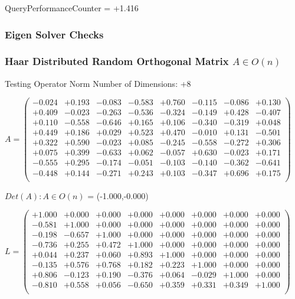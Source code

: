 \documentclass[9pt]{article}
\theoremstyle{plain}
\theoremstyle{definition}
\theoremstyle{remark}
\numberwithin{equation}{section}
\begin{document}
QueryPerformanceCounter  =  +1.416
\subsubsection{Eigen Solver Checks}
\subsubsection{Haar Distributed Random Orthogonal Matrix $A \in O(n)$}
 Testing Operator Norm
Number of Dimensions: +8

$A = \left(
\begin{array}{
cccccccc}
-0.024 & +0.193 & -0.083 & -0.583 & +0.760 & -0.115 & -0.086 & +0.130 \\
+0.409 & -0.023 & -0.263 & -0.536 & -0.324 & -0.149 & +0.428 & -0.407 \\
+0.110 & -0.558 & -0.646 & +0.165 & +0.106 & -0.340 & -0.319 & +0.048 \\
+0.449 & +0.186 & +0.029 & +0.523 & +0.470 & -0.010 & +0.131 & -0.501 \\
+0.322 & +0.590 & -0.023 & +0.085 & -0.245 & -0.558 & -0.272 & +0.306 \\
+0.075 & +0.399 & -0.633 & +0.062 & -0.057 & +0.630 & -0.023 & +0.171 \\
-0.555 & +0.295 & -0.174 & -0.051 & -0.103 & -0.140 & -0.362 & -0.641 \\
-0.448 & +0.144 & -0.271 & +0.243 & +0.103 & -0.347 & +0.696 & +0.175 \\
\end{array}
\right)$ \newline 

$Det(A) :   A \in O(n)$ = (-1.000,-0.000)

$L = \left(
\begin{array}{
cccccccc}
+1.000 & +0.000 & +0.000 & +0.000 & +0.000 & +0.000 & +0.000 & +0.000 \\
-0.581 & +1.000 & +0.000 & +0.000 & +0.000 & +0.000 & +0.000 & +0.000 \\
-0.198 & -0.657 & +1.000 & +0.000 & +0.000 & +0.000 & +0.000 & +0.000 \\
-0.736 & +0.255 & +0.472 & +1.000 & +0.000 & +0.000 & +0.000 & +0.000 \\
+0.044 & +0.237 & +0.060 & +0.893 & +1.000 & +0.000 & +0.000 & +0.000 \\
-0.135 & +0.576 & +0.768 & +0.182 & +0.223 & +1.000 & +0.000 & +0.000 \\
+0.806 & -0.123 & +0.190 & -0.376 & +0.064 & -0.029 & +1.000 & +0.000 \\
-0.810 & +0.558 & +0.056 & -0.650 & +0.359 & +0.331 & +0.349 & +1.000 \\
\end{array}
\right)$ \newline 
\end{document}
